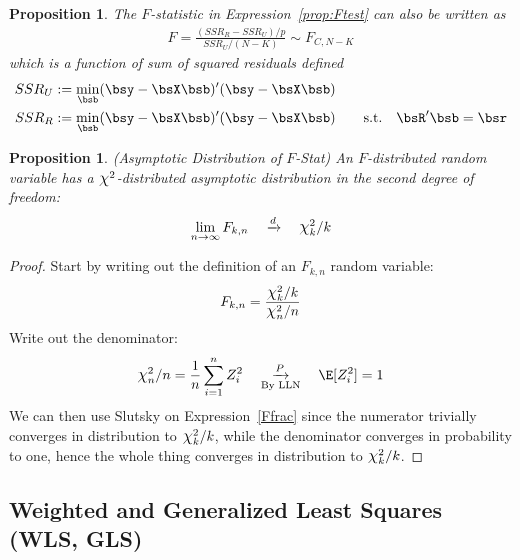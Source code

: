 \documentclass[12pt]{article}
\theoremstyle{plain}
\newtheorem{prop}[thm]{Proposition}
\theoremstyle{definition}
\theoremstyle{remark}
\newcommand*{\Chi}{\mbox{\large$\chi$}} %
\newcommand{\pto}{\xrightarrow{P}}
\newcommand{\dto}{\xrightarrow{d}}
\newcommand{\sumin}{\sum^n_{i=1}}
\newcommand{\limn}{\lim_{n\rightarrow\infty}}
\begin{document}
\begin{prop}
The $F$-statistic in Expression~\ref{prop:Ftest} can also be written as
\begin{align*}
  F = \frac{(SSR_R-SSR_U)/p}{SSR_U/(N-K)}
  \sim F_{C,N-K}
\end{align*}
which is a function of sum of squared residuals defined
\begin{align*}
  SSR_U &:= \min_{\bsb} (\bsy-\bsX\bsb)'(\bsy-\bsX\bsb) \\
  SSR_R &:= \min_{\bsb} (\bsy-\bsX\bsb)'(\bsy-\bsX\bsb)
  \qquad \text{s.t.} \quad \bsR' \bsb = \bsr
\end{align*}
\end{prop}

\clearpage
\begin{prop}\emph{(Asymptotic Distribution of $F$-Stat)}
An $F$-distributed random variable has a $\Chi^2$-distributed asymptotic
distribution in the second degree of freedom:
\begin{align*}
  \limn F_{k,n} \quad\dto \quad\Chi_k^2 / k
\end{align*}
\end{prop}
\begin{proof}
Start by writing out the definition of an $F_{k,n}$ random variable:
\begin{align}
  F_{k,n} =
  \frac{%
    \Chi^2_k/k
  }{\Chi^2_{n}/n}
  \label{Ffrac}
\end{align}
Write out the denominator:
\begin{align*}
  \Chi^2_{n}/n
  = \frac{1}{n} \sumin Z_i^2
  \quad\underset{\text{By LLN}}{\pto}\quad
  \E[Z_i^2] = 1
\end{align*}
We can then use Slutsky on Expression~\ref{Ffrac} since the numerator
trivially converges in distribution to $\Chi_k^2/k$, while the
denominator converges in probability to one, hence the whole thing
converges in distribution to $\Chi_k^2/k$.

\end{proof}

\clearpage
\subsection{Weighted and Generalized Least Squares (WLS, GLS)}
\end{document}
